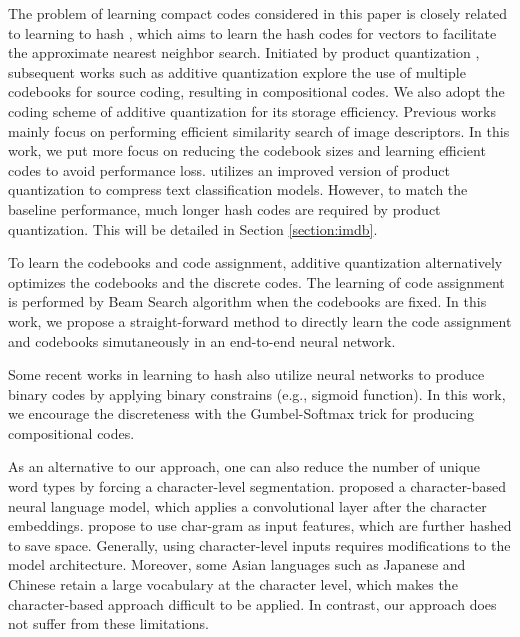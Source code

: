 \documentclass{article} \usepackage{iclr2018_conference_review,times}
\begin{document}
The problem of learning compact codes considered in this paper is closely related to learning to hash \citep{Weiss2008SpectralH,Kulis2009LearningTH,Liu2012SupervisedHW}, which aims to learn the hash codes for vectors to facilitate the approximate nearest neighbor search. Initiated by product quantization \citep{Jgou2011ProductQF}, subsequent works such as additive quantization \citep{Babenko2014AdditiveQF} explore the use of multiple codebooks for source coding, resulting in compositional codes. We also adopt the coding scheme of additive quantization for its storage efficiency. Previous works mainly focus on performing efficient similarity search of image descriptors. In this work, we put more focus on reducing the codebook sizes and learning efficient codes to avoid performance loss. \citet{Joulin2016FastTextzipCT} utilizes an improved version of product quantization to compress text classification models. However, to match the baseline performance, much longer hash codes are required by product quantization. This will be detailed in Section \ref{section:imdb}.

To learn the codebooks and code assignment, additive quantization alternatively optimizes the codebooks and the discrete codes. The learning of code assignment is performed by Beam Search algorithm when the codebooks are fixed. In this work, we propose a straight-forward method to directly learn the code assignment and codebooks simutaneously in an end-to-end neural network. 







Some recent works \citep{Xia2014SupervisedHF,Liu2016DeepSH,Yang2017SupervisedLO} in learning to hash also utilize neural networks to produce binary codes by applying binary constrains (e.g., sigmoid function). In this work, we encourage the discreteness with the Gumbel-Softmax trick for producing compositional codes.









As an alternative to our approach, one can also reduce the number of unique word types by forcing a character-level segmentation. \citet{Kim2016CharacterAwareNL} proposed a character-based neural language model, which applies a convolutional layer after the character embeddings. \citet{Botha2017NaturalLP} propose to use char-gram as input features, which are further hashed to save space. Generally, using character-level inputs requires modifications to the model architecture. Moreover, some Asian languages such as Japanese and Chinese retain a large vocabulary at the character level, which makes the character-based approach difficult to be applied. In contrast, our approach does not suffer from these limitations.
\end{document}
